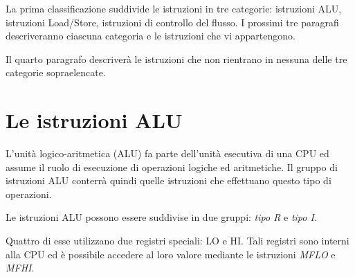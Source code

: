 \documentclass[letterpaper,10pt,english]{sphinxmanual}
\begin{document}
La prima classificazione suddivide le istruzioni in tre categorie: istruzioni
ALU, istruzioni Load/Store, istruzioni di controllo del flusso. I prossimi tre
paragrafi descriveranno ciascuna categoria e le istruzioni che vi
appartengono.

Il quarto paragrafo descriverà le istruzioni che non rientrano in nessuna
delle tre categorie sopraelencate.


\section{Le istruzioni ALU}
\label{instructions:le-istruzioni-alu}
L'unità logico-aritmetica (ALU) fa parte dell'unità esecutiva di una
CPU ed assume il ruolo di esecuzione di operazioni logiche ed aritmetiche. Il
gruppo di istruzioni ALU conterrà quindi quelle istruzioni che effettuano
questo tipo di operazioni.

Le istruzioni ALU possono essere suddivise in due gruppi: \emph{tipo R} e
\emph{tipo I}.

Quattro di esse utilizzano due registri speciali: LO e HI. Tali registri sono
interni alla CPU ed è possibile accedere al loro valore mediante le
istruzioni \emph{MFLO} e \emph{MFHI}.
\end{document}
